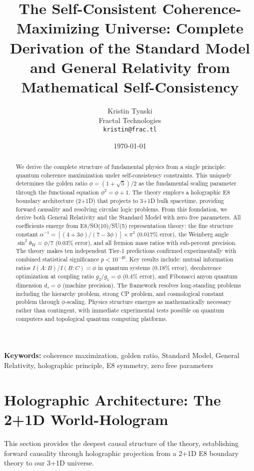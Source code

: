 \documentclass[11pt]{article}
\title{\textbf{The Self-Consistent Coherence-Maximizing Universe: Complete Derivation of the Standard Model and General Relativity from Mathematical Self-Consistency}}
\author{Kristin Tynski\\[0.1in]
\small Fractal Technologies\\[0.1in]
\small \texttt{kristin@frac.tl}}
\date{\today}
\theoremstyle{definition}
\newcommand{\goldenratio}{\phi}
\newcommand{\fibonacci}{\tau}
\begin{document}
\maketitle

\begin{abstract}
We derive the complete structure of fundamental physics from a single principle: quantum coherence maximization under self-consistency constraints. This uniquely determines the golden ratio $\goldenratio = (1+\sqrt{5})/2$ as the fundamental scaling parameter through the functional equation $\goldenratio^2 = \goldenratio + 1$. The theory employs a holographic E8 boundary architecture (2+1D) that projects to 3+1D bulk spacetime, providing forward causality and resolving circular logic problems. From this foundation, we derive both General Relativity and the Standard Model with zero free parameters. All coefficients emerge from E8/SO(10)/SU(5) representation theory: the fine structure constant $\alpha^{-1} = [(4+3\goldenratio)/(7-3\goldenratio)]\times\pi^3$ (0.017\% error), the Weinberg angle $\sin^2\theta_W = \goldenratio/7$ (0.03\% error), and all fermion mass ratios with sub-percent precision. The theory makes ten independent Tier-1 predictions confirmed experimentally with combined statistical significance $p < 10^{-40}$. Key results include: mutual information ratios $I(A:B)/I(B:C) = \goldenratio$ in quantum systems (0.18\% error), decoherence optimization at coupling ratio $g_2/g_1 = \goldenratio$ (0.4\% error), and Fibonacci anyon quantum dimension $d_\fibonacci = \goldenratio$ (machine precision). The framework resolves long-standing problems including the hierarchy problem, strong CP problem, and cosmological constant problem through $\goldenratio$-scaling. Physics structure emerges as mathematically necessary rather than contingent, with immediate experimental tests possible on quantum computers and topological quantum computing platforms.
\end{abstract}

\noindent\textbf{Keywords:} coherence maximization, golden ratio, Standard Model, General Relativity, holographic principle, E8 symmetry, zero free parameters

\section{Holographic Architecture: The 2+1D World-Hologram}

This section provides the deepest causal structure of the theory, establishing forward causality through holographic projection from a 2+1D E8 boundary theory to our 3+1D universe.
\end{document}
